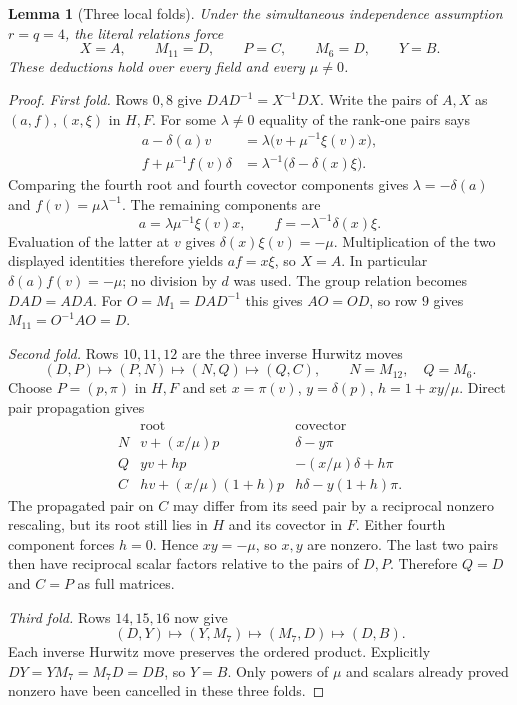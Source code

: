 \documentclass[11pt]{article}
\newtheorem{lemma}[theorem]{Lemma}
\begin{document}
\begin{lemma}[Three local folds]\label{lem:folds}
Under the simultaneous independence assumption $r=q=4$, the
literal relations force
\[
 X=A,\qquad M_{11}=D,\qquad P=C,\qquad M_6=D,\qquad Y=B.
\]
These deductions hold over every field and every $\mu\ne0$.
\end{lemma}
\begin{proof}
\emph{First fold.}
Rows $0,8$ give $DAD^{-1}=X^{-1}DX$.
Write the pairs of $A,X$ as $(a,f),(x,\xi)$ in $H,F$.
For some $\lambda\ne0$ equality of the rank-one pairs says
\[
\begin{split}
a-\delta(a)v&=\lambda\bigl(v+\mu^{-1}\xi(v)x\bigr),\\
f+\mu^{-1}f(v)\delta
 &=\lambda^{-1}\bigl(\delta-\delta(x)\xi\bigr).
\end{split}
\]
Comparing the fourth root and fourth covector components gives
$\lambda=-\delta(a)$ and $f(v)=\mu\lambda^{-1}$.
The remaining components are
\[
 a=\lambda\mu^{-1}\xi(v)x,\qquad
 f=-\lambda^{-1}\delta(x)\xi.
\]
Evaluation of the latter at $v$ gives $\delta(x)\xi(v)=-\mu$.
Multiplication of the two displayed identities therefore yields
$af=x\xi$, so $X=A$.
In particular $\delta(a)f(v)=-\mu$; no division by $d$ was used.
The group relation becomes $DAD=ADA$.
For $O=M_1=DAD^{-1}$ this gives $AO=OD$, so row $9$ gives
$M_{11}=O^{-1}AO=D$.

\emph{Second fold.}
Rows $10,11,12$ are the three inverse Hurwitz moves
\[
 (D,P)\longmapsto(P,N)\longmapsto(N,Q)\longmapsto(Q,C),
 \qquad N=M_{12},\quad Q=M_6.
\]
Choose $P=(p,\pi)$ in $H,F$ and set
$x=\pi(v)$, $y=\delta(p)$, $h=1+xy/\mu$.
Direct pair propagation gives
\[
\begin{array}{c|c|c}
 &\text{root}&\text{covector}\\\hline
N&v+(x/\mu)p&\delta-y\pi\\
Q&yv+hp&-(x/\mu)\delta+h\pi\\
C&hv+(x/\mu)(1+h)p&h\delta-y(1+h)\pi .
\end{array}
\]
The propagated pair on $C$ may differ from its seed pair by a
reciprocal nonzero rescaling, but its root still lies in $H$
and its covector in $F$. Either fourth component forces $h=0$.
Hence $xy=-\mu$, so $x,y$ are nonzero.
The last two pairs then have reciprocal scalar factors relative
to the pairs of $D,P$. Therefore $Q=D$ and $C=P$ as full matrices.

\emph{Third fold.}
Rows $14,15,16$ now give
\[
 (D,Y)\longmapsto(Y,M_7)\longmapsto(M_7,D)\longmapsto(D,B).
\]
Each inverse Hurwitz move preserves the ordered product.
Explicitly $DY=YM_7=M_7D=DB$, so $Y=B$.
Only powers of $\mu$ and scalars already proved nonzero have been
cancelled in these three folds.
\end{proof}
\end{document}
